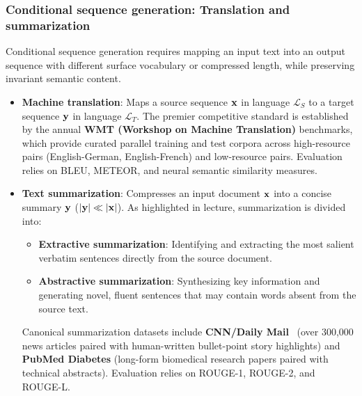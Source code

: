 \documentclass[../../../main.tex]{subfiles}
\begin{document}
\subsubsection{Conditional sequence generation: Translation and summarization}
\label{subsec:translation_summarization}
Conditional sequence generation requires mapping an input text into an output sequence with different surface vocabulary or compressed length, while preserving invariant semantic content.
\begin{itemize}
    \item \textbf{Machine translation}: Maps a source sequence $\mathbf{x}$ in language $\mathcal{L}_S$ to a target sequence $\mathbf{y}$ in language $\mathcal{L}_T$. The premier competitive standard is established by the annual \textbf{WMT (Workshop on Machine Translation)} benchmarks, which provide curated parallel training and test corpora across high-resource pairs (English-German, English-French) and low-resource pairs. Evaluation relies on BLEU, METEOR, and neural semantic similarity measures.
    \item \textbf{Text summarization}: Compresses an input document $\mathbf{x}$ into a concise summary $\mathbf{y}$ ($|\mathbf{y}| \ll |\mathbf{x}|$). As highlighted in lecture, summarization is divided into:
    \begin{itemize}
        \item \textbf{Extractive summarization}: Identifying and extracting the most salient verbatim sentences directly from the source document.
        \item \textbf{Abstractive summarization}: Synthesizing key information and generating novel, fluent sentences that may contain words absent from the source text.
    \end{itemize}
    Canonical summarization datasets include \textbf{CNN/Daily Mail}~\cite{lin2004rouge} (over 300,000 news articles paired with human-written bullet-point story highlights) and \textbf{PubMed Diabetes} (long-form biomedical research papers paired with technical abstracts). Evaluation relies on ROUGE-1, ROUGE-2, and ROUGE-L.
\end{itemize}
\end{document}
